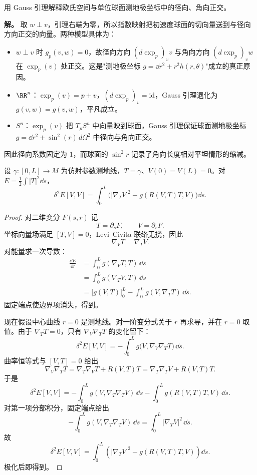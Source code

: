 \begin{exbox}
用 Gauss 引理解释欧氏空间与单位球面测地极坐标中的径向、角向正交。

\textbf{解。} 取 $w\perp v$，引理右端为零，所以指数映射把初速度球面的切向量送到与径向方向正交的向量。两种模型具体为：
\begin{itemize}
\item $w\perp v$ 时 $g_p(v,w)=0$，故径向方向 $(d\exp_p)_v v$ 与角向方向 $(d\exp_p)_v w$ 在 $\exp_p(v)$ 处正交。这是"测地极坐标 $g=\dd r^2+r^2 h(r,\theta)$"成立的真正原因。
\item $\RR^n$：$\exp_p(v)=p+v$，$(d\exp_p)_v=\mathrm{id}$，Gauss 引理退化为 $g(v,w)=g(v,w)$，平凡成立。
\item $S^n$：$\exp_p(v)$ 把 $T_pS^n$ 中向量映到球面，Gauss 引理保证球面测地极坐标 $g=\dd r^2+\sin^2(r)\,d\Omega^2$ 中径向与角向正交。
\end{itemize}

因此径向系数固定为 $1$，而球面的 $\sin^2r$ 记录了角向长度相对平坦情形的缩减。
\end{exbox}

\begin{proposition}[测地线能量的二阶变分]
设 $\gamma:[0,L]\to M$ 为仿射参数测地线，$T=\dot\gamma$、$V(0)=V(L)=0$。对 $E=\frac12\int|T|^2\dd s$，\[\delta^2E[V,V]=\int_0^L\bigl(|\nabla_TV|^2-g(R(V,T)T,V)\bigr)\dd s.\]
\end{proposition}

\begin{proof}
对二维变分 $F(s,r)$ 记
\[
T=\partial_sF,
\qquad
V=\partial_rF.
\]
坐标向量场满足 $[T,V]=0$，Levi--Civita 联络无挠，因此
\[
\nabla_VT=\nabla_TV.
\]
对能量求一次导数：
\[
\begin{aligned}
\frac{\dd E}{\dd r}
&=\int_0^L g(\nabla_VT,T)\,\dd s\\
&=\int_0^L g(\nabla_TV,T)\,\dd s\\
&=\bigl[g(V,T)\bigr]_0^L
-\int_0^L g(V,\nabla_TT)\,\dd s.
\end{aligned}
\]
固定端点使边界项消失，得到。

现在假设中心曲线 $r=0$ 是测地线。对一阶变分式关于 $r$ 再求导，并在 $r=0$ 取值。由于 $\nabla_TT=0$，只有 $\nabla_V\nabla_TT$ 的变化留下：
\[
\delta^2E[V,V]
=-\int_0^L g\bigl(V,\nabla_V\nabla_TT\bigr)\,\dd s.
\]
曲率恒等式与 $[V,T]=0$ 给出
\[
\nabla_V\nabla_TT
=\nabla_T\nabla_VT+R(V,T)T
=\nabla_T\nabla_TV+R(V,T)T.
\]
于是
\[
\delta^2E[V,V]
=-\int_0^L g(V,\nabla_T\nabla_TV)\,\dd s
-\int_0^L g(R(V,T)T,V)\,\dd s.
\]
对第一项分部积分，固定端点给出
\[
-\int_0^L g(V,\nabla_T\nabla_TV)\,\dd s
=\int_0^L|\nabla_TV|^2\,\dd s.
\]
故
\begin{equation}
\boxed{
\delta^2E[V,V]
=\int_0^L
\left(
|\nabla_TV|^2-g(R(V,T)T,V)
\right)\dd s.}
\label{eq:math-dg-energy-second-variation}
\end{equation}
极化后即得到。
\end{proof}


